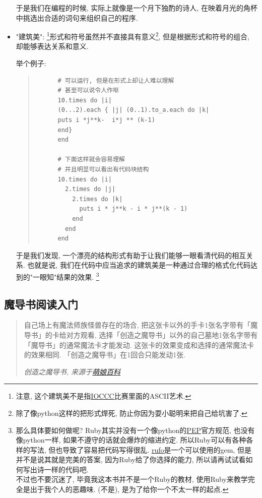 \begin{itemize}
  于是我们在编程的时候, 实际上就像是一个月下独酌的诗人, 在映着月光的角杯中挑选出合适的词句来组织自己的程序. 
  \item "建筑美": \footnote{注意, 这个建筑美不是指\href{https://en.wikipedia.org/wiki/International_Obfuscated_C_Code_Contest}{IOCCC}比赛里面的ASCII艺术. }形式和符号虽然并不直接具有意义\footnote{除了像python这样的把形式焊死, 防止你因为耍小聪明来把自己给坑害了. }, 但是根据形式和符号的组合, 却能够表达关系和意义. 
  
  举个例子: 

  \begin{quotation}
    \begin{verbatim}
      # 可以运行, 但是在形式上却让人难以理解
      # 甚至可以说令人作呕
      10.times do |i|
      (0...2).each { |j| (0..1).to_a.each do |k|
      puts i *j**k-  i*j ** (k-1)
      end}
      end

      # 下面这样就会容易理解
      # 并且明显可以看出有代码块结构
      10.times do |i|
        2.times do |j|
          2.times do |k|
            puts i * j**k - i * j**(k - 1)
          end
        end
      end
    \end{verbatim}
  \end{quotation}

  于是我们发现, 一个漂亮的结构形式有助于让我们能够一眼看清代码的相互关系. 也就是说, 我们在代码中应当追求的建筑美是一种通过合理的格式化代码达到的"一眼知"结果的效果. \footnote{那么具体要如何做呢? Ruby其实并没有一个像python的\href{https://peps.python.org/pep-0008/}{PEP}官方规范, 也没有像python一样, 如果不遵守的话就会爆炸的缩进约定. 所以Ruby可以有各种各样的写法, 但也导致了容易把代码写得很乱. \href{https://github.com/ruby-formatter/rufo}{rufo}是一个可以使用的gem, 但是并不是说其就是完美的答案, 因为Ruby给了你选择的能力, 所以请再试试看如何写出诗一样的代码吧. \\不过也不要沉迷了, 毕竟我这本书并不是一个Ruby的教材, 使用Ruby来教学完全是出于我个人的恶趣味. (不是), 是为了给你一个不太一样的起点. }
\end{itemize}

\subsection{魔导书阅读入门}
\begin{quotation}
  自己场上有魔法师族怪兽存在的场合, 把这张卡以外的手卡1张名字带有「魔导书」的卡给对方观看, 选择「创造之魔导书」以外的自己墓地1张名字带有「魔导书」的通常魔法卡才能发动. 这张卡的效果变成和选择的通常魔法卡的效果相同. 「创造之魔导书」在1回合只能发动1张. 

  \emph{创造之魔导书, 来源于\href{https://zh.moegirl.org.cn/创造之魔导书}{萌娘百科}}
\end{quotation}

